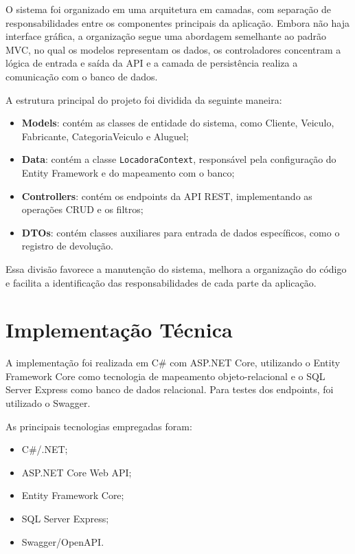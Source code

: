 \documentclass[12pt]{article}
\begin{document}
O sistema foi organizado em uma arquitetura em camadas, com separação de responsabilidades entre os componentes principais da aplicação. Embora não haja interface gráfica, a organização segue uma abordagem semelhante ao padrão MVC, no qual os modelos representam os dados, os controladores concentram a lógica de entrada e saída da API e a camada de persistência realiza a comunicação com o banco de dados.

A estrutura principal do projeto foi dividida da seguinte maneira:

\begin{itemize}
\item \textbf{Models}: contém as classes de entidade do sistema, como Cliente, Veiculo, Fabricante, CategoriaVeiculo e Aluguel;
\item \textbf{Data}: contém a classe \texttt{LocadoraContext}, responsável pela configuração do Entity Framework e do mapeamento com o banco;
\item \textbf{Controllers}: contém os endpoints da API REST, implementando as operações CRUD e os filtros;
\item \textbf{DTOs}: contém classes auxiliares para entrada de dados específicos, como o registro de devolução.
\end{itemize}

Essa divisão favorece a manutenção do sistema, melhora a organização do código e facilita a identificação das responsabilidades de cada parte da aplicação.

\section{Implementação Técnica}

A implementação foi realizada em C\# com ASP.NET Core, utilizando o Entity Framework Core como tecnologia de mapeamento objeto-relacional e o SQL Server Express como banco de dados relacional. Para testes dos endpoints, foi utilizado o Swagger.

As principais tecnologias empregadas foram:

\begin{itemize}
\item C\#/.NET;
\item ASP.NET Core Web API;
\item Entity Framework Core;
\item SQL Server Express;
\item Swagger/OpenAPI.
\end{itemize}
\end{document}
